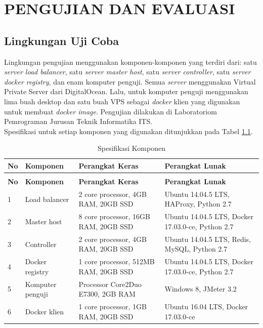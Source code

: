 \chapter{PENGUJIAN DAN EVALUASI}

\section{Lingkungan Uji Coba}
	Lingkungan pengujian menggunakan komponen-komponen yang terdiri dari: satu \textit{server load balancer}, satu \textit{server master host}, satu \textit{server controller}, satu \textit{server docker registry}, dan enam komputer penguji. Semua \textit{server} menggunakan Virtual Private Server dari DigitalOcean. Lalu, untuk komputer penguji menggunakan lima buah desktop dan satu buah VPS sebagai \textit{docker} klien yang digunakan untuk membuat \textit{docker image}. Pengujian dilakukan di Laboratoriom Pemrograman Jurusan Teknik Informatika ITS. \\
    \indent Spesifikasi untuk setiap komponen yang digunakan ditunjukkan pada Tabel \ref{spesifikasikomponen}.
    \begin{longtable}{|p{}|p{}|p{}|p{}|}					\caption{Spesifikasi Komponen} \label{spesifikasikomponen} \\
        \hline
        \textbf{No} & \textbf{Komponen} & \textbf{Perangkat Keras} & \textbf{Perangkat Lunak} \\ \hline
        \endfirsthead
        \caption[]{Spesifikasi Komponen} \\
        \hline
        \textbf{No} & \textbf{Komponen} & \textbf{Perangkat Keras} & \textbf{Perangkat Lunak} \\ \hline
        \endhead
        \endfoot
        \endlastfoot

    	1 & Load balancer & 2 core processor, 4GB RAM, 20GB SSD & Ubuntu 14.04.5 LTS, HAProxy, Python 2.7 \\ \hline
        2 & Master host & 8 core processor, 16GB RAM, 20GB SSD & Ubuntu 14.04.5 LTS, Docker 17.03.0-ce, Python 2.7 \\ \hline
        3 & Controller & 2 core processor, 4GB RAM, 20GB SSD & Ubuntu 14.04.5 LTS, Redis, MySQL, Python 2.7 \\ \hline
        4 & Docker registry & 1 core processor, 512MB RAM, 20GB SSD & Ubuntu 14.04.5 LTS, Docker 17.03.0-ce, Python 2.7 \\ \hline
        5 & Komputer penguji & Processor Core2Duo E7300, 2GB RAM & Windows 8, JMeter 3.2 \\ \hline
        6 & Docker klien & 1 core processor, 1GB RAM, 20GB SSD & Ubuntu 16.04 LTS, Docker 17.03.0-ce \\ \hline
    \end{longtable}
    
